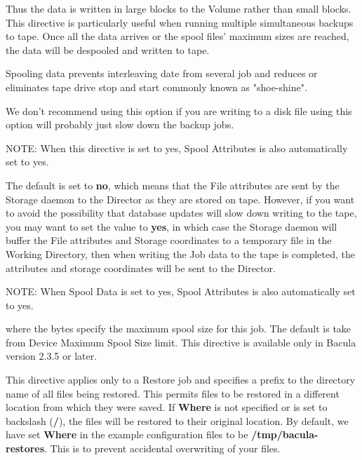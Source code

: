 \begin{description}
   Thus the data is written in large blocks to the Volume rather than small
   blocks.  This directive is particularly useful when running multiple
   simultaneous backups to tape.  Once all the data arrives or the spool
   files' maximum sizes are reached, the data will be despooled and written
   to tape.

   Spooling data prevents interleaving date from several job and reduces or
   eliminates tape drive stop and start commonly known as "shoe-shine".
   
   We don't recommend using this option if you are writing to a disk file
   using this option will probably just slow down the backup jobs.

   NOTE: When this directive is set to yes, Spool Attributes is also
   automatically set to yes.

\item [Spool Attributes = \lt{}yes\vb{}no\gt{}]
   The default is set to {\bf no}, which means that the File attributes are
   sent by the Storage daemon to the Director as they are stored on tape.
   However, if you want to avoid the possibility that database updates will
   slow down writing to the tape, you may want to set the value to {\bf
   yes}, in which case the Storage daemon will buffer the File attributes
   and Storage coordinates to a temporary file in the Working Directory,
   then when writing the Job data to the tape is completed, the attributes
   and storage coordinates will be sent to the Director.

   NOTE: When Spool Data is set to yes, Spool Attributes is also
   automatically set to yes.

\item [SpoolSize={\it bytes}]
   where the bytes specify the maximum spool size for this job.
   The default is take from Device Maximum Spool Size limit. 
   This directive is available only in Bacula version 2.3.5 or 
   later.


\item [Where = \lt{}directory\gt{}]
   This directive applies only to a Restore job and specifies a prefix to
   the directory name of all files being restored.  This permits files to
   be restored in a different location from which they were saved.  If {\bf
   Where} is not specified or is set to backslash ({\bf /}), the files will
   be restored to their original location.  By default, we have set {\bf
   Where} in the example configuration files to be {\bf
   /tmp/bacula-restores}.  This is to prevent accidental overwriting of
   your files.


\end{description}
